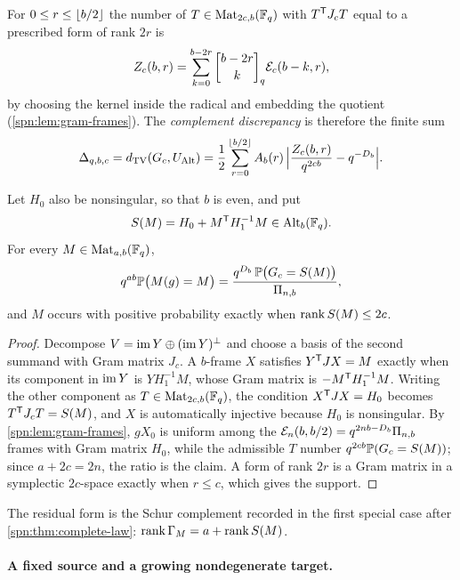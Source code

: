 For $0\le r\le\lfloor b/2\rfloor$ the number of $T\in\operatorname{Mat}_{2c,b}(\mathbb{F}_q)$ with $T^{\mathsf{T}}J_cT$ equal to
a prescribed form of rank $2r$ is
\[
 Z_c(b,r)=\sum_{k=0}^{b-2r}\spnqbin{b-2r}{k}{q}\spnEmb_c(b-k,r),
\]
by choosing the kernel inside the radical and embedding the quotient
(\cref{spn:lem:gram-frames}). The \emph{complement discrepancy} is therefore the finite sum
\begin{equation}\label{spn:eq:complement-discrepancy}
 \Delta_{q,b,c}=d_{\mathrm{TV}}(G_c,U_{\operatorname{Alt}})
 =\frac12\sum_{r=0}^{\lfloor b/2\rfloor}A_b(r)\,
 \Bigl|\frac{Z_c(b,r)}{q^{2cb}}-q^{-D_b}\Bigr| .
\end{equation}

\begin{proposition}\label{spn:prop:residual}
Let $H_0$ also be nonsingular, so that $b$ is even, and put
\begin{equation}\label{spn:eq:residual-form}
 S(M)=H_0+M^{\mathsf{T}}H_1^{-1}M\in\operatorname{Alt}_b(\mathbb{F}_q).
\end{equation}
For every $M\in\operatorname{Mat}_{a,b}(\mathbb{F}_q)$,
\[
 q^{ab}\mathbb{P}\bigl(M(g)=M\bigr)=\frac{q^{D_b}\,\mathbb{P}\bigl(G_c=S(M)\bigr)}{\Pi_{n,b}} ,
\]
and $M$ occurs with positive probability exactly when $\operatorname{rank} S(M)\le2c$.
\end{proposition}

\begin{proof}
Decompose $V=\operatorname{im} Y\oplus(\operatorname{im} Y)^\perp$ and choose a basis of the second summand with Gram
matrix $J_c$. A $b$-frame $X$ satisfies $Y^{\mathsf{T}}JX=M$ exactly when its component in
$\operatorname{im} Y$ is $YH_1^{-1}M$, whose Gram matrix is $-M^{\mathsf{T}}H_1^{-1}M$. Writing the other
component as $T\in\operatorname{Mat}_{2c,b}(\mathbb{F}_q)$, the condition $X^{\mathsf{T}}JX=H_0$ becomes
$T^{\mathsf{T}}J_cT=S(M)$, and $X$ is automatically injective because $H_0$ is nonsingular. By
\cref{spn:lem:gram-frames}, $gX_0$ is uniform among the
$\mathcal{E}_n(b,b/2)=q^{2nb-D_b}\Pi_{n,b}$ frames with Gram matrix $H_0$, while the admissible
$T$ number $q^{2cb}\mathbb{P}(G_c=S(M))$; since $a+2c=2n$, the ratio is the claim. A form of rank
$2r$ is a Gram matrix in a symplectic $2c$-space exactly when $r\le c$, which gives the support.
\end{proof}

The residual form is the Schur complement recorded in the first special case after
\cref{spn:thm:complete-law}: $\operatorname{rank}\Gamma_M=a+\operatorname{rank} S(M)$.

\paragraph{A fixed source and a growing nondegenerate target.}

